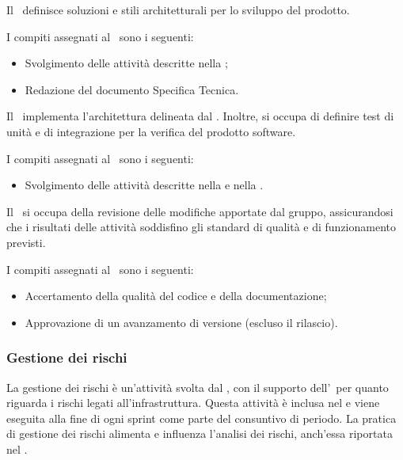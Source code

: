 \par Il \Progettista\ definisce soluzioni e stili architetturali per lo sviluppo del prodotto.
\par I compiti assegnati al \Progettista\ sono i seguenti:
\begin{itemize}
  \item Svolgimento delle attività descritte nella ;
  \item Redazione del documento Specifica Tecnica.
\end{itemize}

\par Il \Programmatore\ implementa l'architettura delineata dal \Progettista. Inoltre, si occupa di definire test di unità e di integrazione per la verifica del prodotto software.
\par I compiti assegnati al \Programmatore\ sono i seguenti:
\begin{itemize}
  \item Svolgimento delle attività descritte nella  e nella .
\end{itemize}

\par Il \Verificatore\ si occupa della revisione delle modifiche apportate dal gruppo, assicurandosi che i risultati delle attività soddisfino gli standard di qualità e di funzionamento previsti.
\par I compiti assegnati al \Verificatore\ sono i seguenti:
\begin{itemize}
  \item Accertamento della qualità del codice e della documentazione;
  \item Approvazione di un avanzamento di versione (escluso il rilascio).
\end{itemize}

\subsubsection{Gestione dei rischi}
\par La gestione dei rischi è un’attività svolta dal \Responsabile, con il supporto dell’\Amministratore\ per quanto riguarda i rischi legati all’infrastruttura. Questa attività è inclusa nel \PianoDiProgetto e viene eseguita alla fine di ogni sprint come parte del consuntivo di periodo. La pratica di gestione dei rischi alimenta e influenza l’analisi dei rischi, anch’essa riportata nel \PianoDiProgetto.

